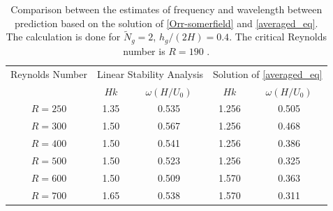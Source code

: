 \documentclass[12pt]{report}   %
\newcommand{\Ndg}{\tilde{N}_g}
\begin{document}
\begin{centering} 
\begin{table}
\begin{tabular}{|c|c|c|c|c|}
\hline
  Reynolds Number 
   &\multicolumn{2}{c|}{Linear Stability Analysis }&\multicolumn{2}{c|}{ Solution of \eqref{averaged_eq}}\\
\cline{2-5}
 & $H k$
 & $\omega (H/U_0)$ & $ H k$  &  $\omega (H/U_0)$ \\
\hline
$ R = 250 $ &    1.35 & 0.535 & 1.256 &  0.505 \\
$ R = 300 $ &    1.50 & 0.567 & 1.256 &  0.468 \\
$ R = 400 $ &    1.50 & 0.541 & 1.256 &  0.386 \\
$ R = 500 $ &	  1.50 & 0.523 & 1.256 &  0.325 \\
$ R = 600 $ &	  1.50 & 0.509 & 1.570 &  0.363 \\
$ R = 700 $ &     1.65 & 0.538 & 1.570 &  0.311 \\

\hline
\end{tabular}
 \caption{Comparison between the estimates of frequency and wavelength between prediction based on the solution of \eqref{Orr-somerfield} and \eqref{averaged_eq}. The calculation is done for $\Ndg=2$, $h_g/(2H)=0.4$. The critical Reynolds number is $R=190$ .}
 \label{tab:LinearStabilityVsCFD}
\end{table}
\end{centering}
\end{document}
